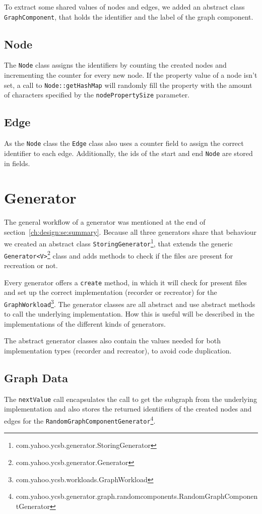 To extract some shared values of nodes and edges,
we added an abstract class \texttt{GraphComponent},
that holds the identifier and the label of the graph component.

\subsection{Node}
The \texttt{Node} class assigns the identifiers by counting the created nodes and incrementing the counter for every new node.
If the property value of a node isn't set,
a call to \texttt{Node::getHashMap} will randomly fill the property with the amount of characters specified by the \texttt{nodePropertySize} parameter.

\subsection{Edge}
As the \texttt{Node} class the \texttt{Edge} class also uses a counter field to assign the correct identifier to each edge.
Additionally,
the ids of the start and end \texttt{Node} are stored in fields.

\section{Generator}
\label{ch:implementation:se:generator}
The general workflow of a generator was mentioned at the end of section~\ref{ch:design:se:summary}.
Because all three generators share that behaviour we created an abstract class \texttt{StoringGenerator}\footnote{com.yahoo.ycsb.generator.StoringGenerator},
that extends the generic \texttt{Generator<V>}\footnote{com.yahoo.ycsb.generator.Generator} class and adds methods to check if the files are present for recreation or not.

Every generator offers a \texttt{create} method,
in which it will check for present files and set up the correct implementation (recorder or recreator) for the \texttt{GraphWorkload}\footnote{com.yahoo.ycsb.workloads.GraphWorkload}.
The generator classes are all abstract and use abstract methods to call the underlying implementation.
How this is useful will be described in the implementations of the different kinds of generators.

The abstract generator classes also contain the values needed for both implementation types (recorder and recreator),
to avoid code duplication.

\subsection{Graph Data}
The \texttt{nextValue} call encapsulates the call to get the subgraph from the underlying implementation and also stores the returned identifiers of the created nodes and edges for the \texttt{RandomGraphComponentGenerator}\footnote{com.yahoo.ycsb.generator.graph.randomcomponents.RandomGraphComponentGenerator}.

